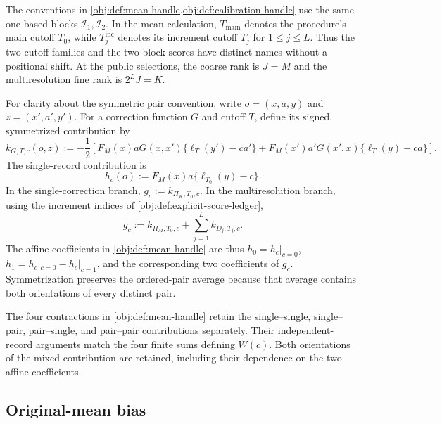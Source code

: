 The conventions in \cref{obj:def:mean-handle,obj:def:calibration-handle} use the same one-based blocks \(\mathcal I_1,\mathcal I_2\). In the mean calculation, \(T_{\mathrm{main}}\) denotes the procedure's main cutoff \(T_0\), while \(T_j^{\mathrm{inc}}\) denotes its increment cutoff \(T_j\) for \(1\le j\le L\). Thus the two cutoff families and the two block scores have distinct names without a positional shift. At the public selections, the coarse rank is \(J=M\) and the multiresolution fine rank is \(2^LJ=K\).

For clarity about the symmetric pair convention, write \(o=(x,a,y)\) and \(z=(x',a',y')\). For a correction function \(G\) and cutoff \(T\), define its signed, symmetrized contribution by
\[
k_{G,T,c}(o,z)
:=-\frac12\left[
F_M(x)aG(x,x')\{\ell_T(y')-ca'\}
+
F_M(x')a'G(x',x)\{\ell_T(y)-ca\}
\right].
\]
The single-record contribution is
\[
h_c(o):=F_M(x)a\{\ell_{T_0}(y)-c\}.
\]
In the single-correction branch, \(g_c:=k_{\Pi_K,T_0,c}\). In the multiresolution branch, using the increment indices of \cref{obj:def:explicit-score-ledger},
\[
g_c:=k_{\Pi_M,T_0,c}
+\sum_{j=1}^{L}k_{D_j,T_j,c}.
\]
The affine coefficients in \cref{obj:def:mean-handle} are thus \(h_0=h_c|_{c=0}\), \(h_1=h_c|_{c=0}-h_c|_{c=1}\), and the corresponding two coefficients of \(g_c\). Symmetrization preserves the ordered-pair average because that average contains both orientations of every distinct pair.

The four contractions in \cref{obj:def:mean-handle} retain the single--single, single--pair, pair--single, and pair--pair contributions separately. Their independent-record arguments match the four finite sums defining \(W(c)\). Both orientations of the mixed contribution are retained, including their dependence on the two affine coefficients.

\subsection{Original-mean bias}

